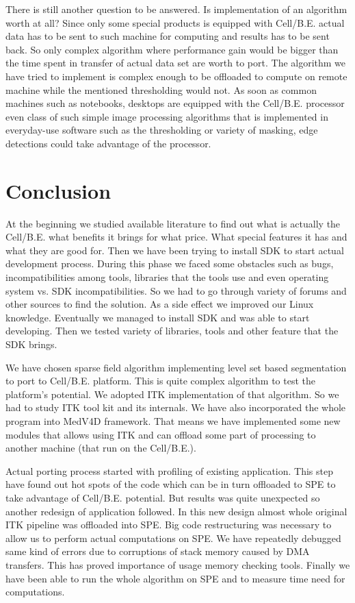 \par
There is still another question to be answered.
Is implementation of an algorithm worth at all?
Since only some special products is equipped with \mbox{Cell/B.E.} actual data has to be sent to such machine for computing and results has to be sent back.
So only complex algorithm where performance gain would be bigger than the time spent in transfer of actual data set are worth to port.
The algorithm we have tried to implement is complex enough to be offloaded to compute on remote machine while the mentioned thresholding would not.
As soon as common machines such as notebooks, desktops are equipped with the \mbox{Cell/B.E.} processor even class of such simple image processing algorithms that is implemented in everyday-use software such as the thresholding or variety of masking, edge detections could take advantage of the processor.

\chapter{Conclusion}

\par
At the beginning we studied available literature to find out what is actually the \mbox{Cell/B.E.} what benefits it brings for what price.
What special features it has and what they are good for.
Then we have been trying to install SDK to start actual development process.
During this phase we faced some obstacles such as bugs, incompatibilities among tools, libraries that the tools use and even operating system vs. SDK incompatibilities.
So we had to go through variety of forums and other sources to find the solution.
As a side effect we improved our Linux knowledge.
Eventually we managed to install SDK and was able to start developing.
Then we tested variety of libraries, tools and other feature that the SDK brings.

\par
We have chosen sparse field algorithm implementing level set based segmentation to port to \mbox{Cell/B.E.} platform.
This is quite complex algorithm to test the platform's potential.
We adopted ITK implementation of that algorithm.
So we had to study ITK tool kit and its internals.
We have also incorporated the whole program into MedV4D framework.
That means we have implemented some new modules that allows using ITK and can offload some part of processing to another machine (that run on the \mbox{Cell/B.E.}).

\par
Actual porting process started with profiling of existing application.
This step have found out hot spots of the code which can be in turn offloaded to SPE to take advantage of \mbox{Cell/B.E.} potential.
But results was quite unexpected so another redesign of application followed.
In this new design almost whole original ITK pipeline was offloaded into SPE.
Big code restructuring was necessary to allow us to perform actual computations on SPE.
We have repeatedly debugged same kind of errors due to corruptions of stack memory caused by DMA transfers.
This has proved importance of usage memory checking tools.
Finally we have been able to run the whole algorithm on SPE and to measure time need for computations.

